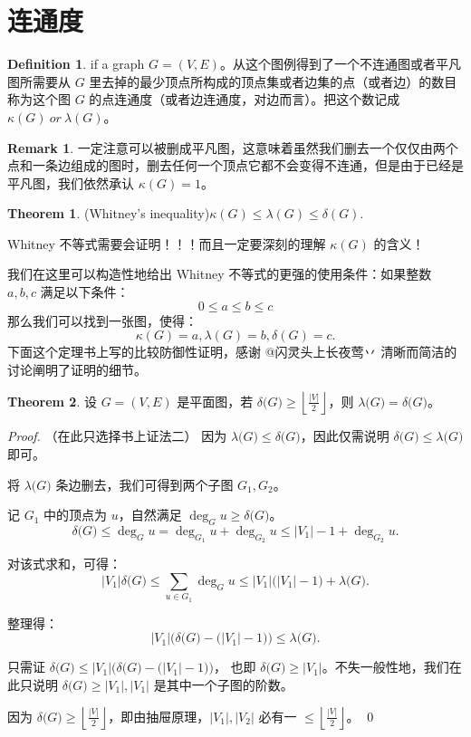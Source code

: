 \documentclass[oneside]{book}
\theoremstyle{definition}
\newtheorem{definition}{Definition}[section]
\newtheorem{theorem}{Theorem}[section]
\newtheorem{remark}{Remark}[section]
\begin{document}
\section{连通度}
\begin{definition}
	if a graph \(G=(V,E)\)。从这个图例得到了一个不连通图或者平凡图所需要从 \(G\) 里去掉的最少顶点所构成的顶点集或者边集的点（或者边）的数目称为这个图 \(G\) 的点连通度（或者边连通度，对边而言）。把这个数记成 \(\kappa(G)\ or\ \lambda(G)\)。 
\end{definition}
\begin{remark}
	一定注意可以被删成平凡图，这意味着虽然我们删去一个仅仅由两个点和一条边组成的图时，删去任何一个顶点它都不会变得不连通，但是由于已经是平凡图，我们依然承认 \(\kappa(G)=1\)。
\end{remark}
\begin{theorem}
	(Whitney's inequality)\(\kappa(G)\leq\lambda(G)\leq\delta(G)\).
\end{theorem}
Whitney 不等式需要会证明！！！而且一定要深刻的理解 \(\kappa(G)\) 的含义！

我们在这里可以构造性地给出 Whitney 不等式的更强的使用条件：如果整数 \(a,b,c\) 满足以下条件：
\[0\leq a\leq b\leq c\] 那么我们可以找到一张图，使得：
\[\kappa(G)=a,\lambda(G)=b,\delta(G)=c.\]
下面这个定理书上写的比较防御性证明，感谢 @闪灵头上长夜莺丷 清晰而简洁的讨论阐明了证明的细节。
\begin{theorem}
	设 \( G = (V, E) \) 是平面图，若 \( \delta\bigl(G\bigr) \geq \left\lfloor \frac{|V|}{2} \right\rfloor \)，则 \( \lambda\bigl(G\bigr) = \delta\bigl(G\bigr) \)。
\end{theorem}

\begin{proof}
	（在此只选择书上证法二）
	因为 \( \lambda\bigl(G\bigr) \leq \delta\bigl(G\bigr) \)，因此仅需说明 \( \delta\bigl(G\bigr) \leq \lambda\bigl(G\bigr) \) 即可。
	
	将 \( \lambda\bigl(G\bigr) \) 条边删去，我们可得到两个子图 \( G_1, G_2 \)。
	
	记 \( G_1 \) 中的顶点为 \( u \)，自然满足 \( \deg_G u \geq \delta\bigl(G\bigr) \)。
	\[
	\delta\bigl(G\bigr) \leq \deg_G u = \deg_{G_1} u + \deg_{G_2} u \leq |V_1| - 1 + \deg_{G_2} u.
	\]
	
	对该式求和，可得：
	\[
	|V_1| \delta\bigl(G\bigr) \leq \sum_{u \in G_1} \deg_G u \leq |V_1|\bigl(|V_1| - 1\bigr) + \lambda\bigl(G\bigr).
	\]
	
	整理得：
	\[
	|V_1| \bigl( \delta\bigl(G\bigr) - \bigl(|V_1| - 1\bigr) \bigr) \leq \lambda\bigl(G\bigr).
	\]
	
	只需证 \( \delta\bigl(G\bigr) \leq |V_1| \bigl( \delta\bigl(G\bigr) - \bigl(|V_1| - 1\bigr) \bigr) \)，
	也即 \( \delta\bigl(G\bigr) \geq |V_1| \)。不失一般性地，我们在此只说明 \( \delta\bigl(G\bigr) \geq |V_1|, |V_1| \) 是其中一个子图的阶数。
	
	因为 \( \delta\bigl(G\bigr) \geq \left\lfloor \frac{|V|}{2} \right\rfloor \)，即由抽屉原理，\( |V_1|, |V_2| \) 必有一 \( \leq \left\lfloor \frac{|V|}{2} \right\rfloor \)。
	\qed
\end{proof}
\end{document}
